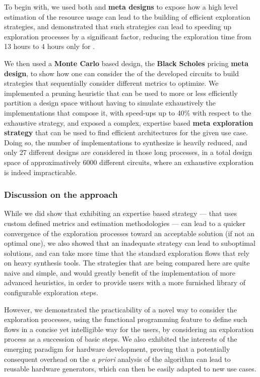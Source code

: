         To begin with, we used both  and  {\bf meta designs} to expose how a high level estimation of the resource usage can lead to the building of efficient exploration strategies, and demonstrated that such strategies can lead to speeding up exploration processes by a significant factor, reducing the exploration time from 13 hours to 4 hours only for .

        We then used a {\bf Monte Carlo} based design, the {\bf Black Scholes} pricing {\bf meta design}, to show how one can consider the  of the developed circuits to build strategies that sequentially consider different metrics to optimize.
        We implemented a pruning heuristic that can be used to more or less efficiently partition a design space without having to simulate exhaustively the implementations that compose it, with speed-ups up to 40\% with respect to the exhaustive strategy, and exposed a complex, expertise based {\bf meta exploration strategy} that can be used to find efficient architectures for the given use case.
        Doing so, the number of implementations to synthesize is heavily reduced, and only 27 different designs are considered in those long processes, in a total design space of approximatively 6000 different circuits, where an exhaustive exploration is indeed impracticable.
    
    \subsubsection{Discussion on the approach}
        While we did show that exhibiting an expertise based strategy --- that uses custom defined metrics and estimation methodologies --- can lead to a quicker convergence of the exploration processes toward an acceptable solution (if not an optimal one), we also showed that an inadequate strategy can lead to suboptimal solutions, and can take more time that the standard exploration flows that rely on heavy synthesis tools.
        The strategies that are being compared here are quite naive and simple, and  would greatly benefit of the implementation of more advanced heuristics, in order to provide users with a more furnished library of configurable exploration steps.

        However, we demonstrated the practicability of a novel way to consider the exploration processes, using the functional programming feature to define such flows in a concise yet intelligible way for the users, by considering an exploration process as a succession of basic steps.
        We also exhibited the interests of the emerging  paradigm for hardware development, proving that a potentially consequent overhead on the {\it a priori} analysis of the algorithm can lead to reusable hardware generators, which can then be easily adapted to new use cases.

